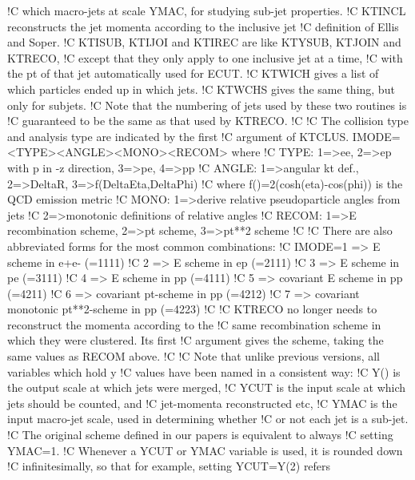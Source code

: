 !C     which macro-jets at scale YMAC, for studying sub-jet properties.
!C     KTINCL reconstructs the jet momenta according to the inclusive jet
!C     definition of Ellis and Soper.
!C     KTISUB, KTIJOI and KTIREC are like KTYSUB, KTJOIN and KTRECO,
!C     except that they only apply to one inclusive jet at a time,
!C     with the pt of that jet automatically used for ECUT.
!C     KTWICH gives a list of which particles ended up in which jets.
!C     KTWCHS gives the same thing, but only for subjets.
!C     Note that the numbering of jets used by these two routines is
!C     guaranteed to be the same as that used by KTRECO.
!C
!C     The collision type and analysis type are indicated by the first
!C     argument of KTCLUS. IMODE=<TYPE><ANGLE><MONO><RECOM> where
!C     TYPE:  1=>ee, 2=>ep with p in -z direction, 3=>pe, 4=>pp
!C     ANGLE: 1=>angular kt def., 2=>DeltaR, 3=>f(DeltaEta,DeltaPhi)
!C            where f()=2(cosh(eta)-cos(phi)) is the QCD emission metric
!C     MONO:  1=>derive relative pseudoparticle angles from jets
!C            2=>monotonic definitions of relative angles
!C     RECOM: 1=>E recombination scheme, 2=>pt scheme, 3=>pt**2 scheme
!C
!C     There are also abbreviated forms for the most common combinations:
!C     IMODE=1 => E scheme in e+e-                              (=1111)
!C           2 => E scheme in ep                                (=2111)
!C           3 => E scheme in pe                                (=3111)
!C           4 => E scheme in pp                                (=4111)
!C           5 => covariant E scheme in pp                      (=4211)
!C           6 => covariant pt-scheme in pp                     (=4212)
!C           7 => covariant monotonic pt**2-scheme in pp        (=4223)
!C
!C     KTRECO no longer needs to reconstruct the momenta according to the
!C     same recombination scheme in which they were clustered. Its first
!C     argument gives the scheme, taking the same values as RECOM above.
!C
!C     Note that unlike previous versions, all variables which hold y
!C     values have been named in a consistent way:
!C     Y()  is the output scale at which jets were merged,
!C     YCUT is the input scale at which jets should be counted, and
!C          jet-momenta reconstructed etc,
!C     YMAC is the input macro-jet scale, used in determining whether
!C          or not each jet is a sub-jet.
!C     The original scheme defined in our papers is equivalent to always
!C     setting YMAC=1.
!C     Whenever a YCUT or YMAC variable is used, it is rounded down
!C     infinitesimally, so that for example, setting YCUT=Y(2) refers
